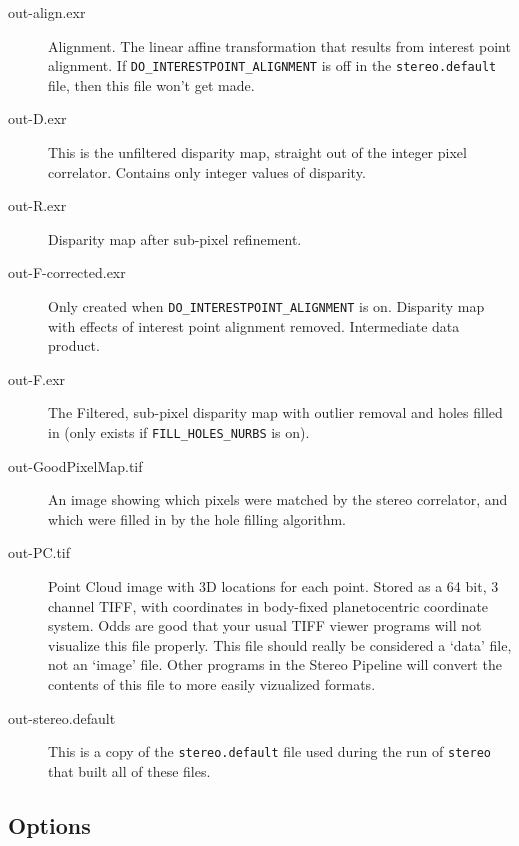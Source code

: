 \begin{description}
\item[out-align.exr] Alignment.  The linear affine transformation
that results from interest point alignment.  If
\texttt{DO\_INTERESTPOINT\_ALIGNMENT} is off in the \texttt{stereo.default}
file, then this file won't get made.

\item[out-D.exr] 
This is the unfiltered disparity map, straight out of the integer
pixel correlator.  Contains only integer values of disparity.

\item[out-R.exr] Disparity map after sub-pixel refinement.

\item[out-F-corrected.exr]
Only created when \texttt{DO\_INTERESTPOINT\_ALIGNMENT} is on.
Disparity map with effects of interest point alignment removed.
Intermediate data product.

\item[out-F.exr]
The Filtered, sub-pixel disparity map with outlier removal and holes
filled in (only exists if \texttt{FILL\_HOLES\_NURBS} is on).

\item[out-GoodPixelMap.tif]
An image showing which pixels were matched by the stereo correlator,
and which were filled in by the hole filling algorithm.

\item[out-PC.tif]
Point Cloud image with 3D locations for each point.  Stored as a
64 bit, 3 channel TIFF, with coordinates in body-fixed planetocentric
coordinate system.  Odds are good that your usual TIFF viewer
programs will not visualize this file properly.  This file should
really be considered a `data' file, not an `image' file.  Other
programs in the Stereo Pipeline will convert the contents of this
file to more easily vizualized formats.

\item[out-stereo.default] This is a copy of the \texttt{stereo.default} file
  used during the run of \texttt{stereo} that built all of these
  files.


\end{description}



\subsection{Options}


